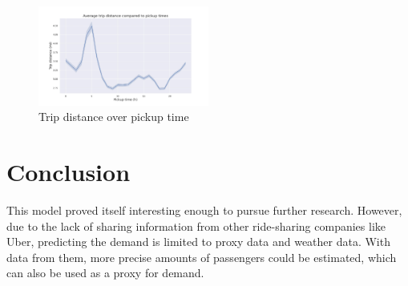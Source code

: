\documentclass[11pt]{article}
\begin{document}
\begin{figure}[h]
    \includegraphics[width=0.5\textwidth]{pickuptime_distance.jpeg}
    \centering
    \caption{Trip distance over pickup time} \label{fig:tripdist}%
\end{figure}

\section{Conclusion}

This model proved itself interesting enough to pursue further research. However, due to the lack of sharing information from other ride-sharing companies like Uber, predicting the demand is limited to proxy data and weather data. With data from them, more precise amounts of passengers could be estimated, which can also be used as a proxy for demand.


\clearpage

\printbibliography
\end{document}
